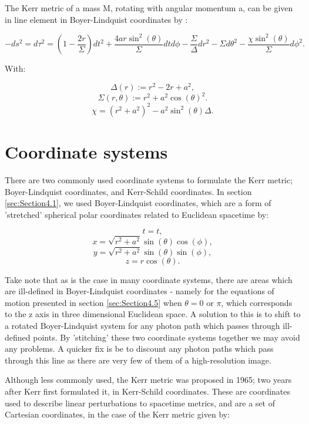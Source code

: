 \documentclass[oneside,openright,frontopenright, singlespacing]{dmathesis}
\begin{document}
\vspace{1em}
	The Kerr metric of a mass M, rotating with angular momentum a, can be given in line element in Boyer-Lindquist coordinates by \cite{boyer1967maximal}:

	\[-ds^2=d\tau^{2} = \left(1-\frac{2r}{\Sigma}\right)dt^2+\frac{4ar\sin^2(\theta)}{\Sigma}dtd\phi-\frac{\Sigma}{\Delta}dr^2-{\Sigma}d\theta^2-\frac{\chi\sin^2(\theta)}{\Sigma}d\phi^2.\]

\vspace{1em}
	With:
	
	\[\Delta(r) := r^2 - 2r + a^2,\]
	\[\Sigma(r, \theta) := r^2 + a^2\cos(\theta)^2.\]
	\[\chi = (r^2+a^2)^2-a^2\sin^2(\theta)\Delta.\]

\section{Coordinate systems}\label{sec:Section4.2}

	There are two commonly used coordinate systems to formulate the Kerr metric; Boyer-Lindquist coordinates\cite{boyer1967maximal}, and Kerr-Schild coordinates\cite{debney1969solutions}. In section \ref{sec:Section4.1}, we used Boyer-Lindquist coordinates, which are a form of 'stretched' spherical polar coordinates related to Euclidean spacetime by:

	\[t=t,\]
	\[x = \sqrt{r^2+a^2}\sin(\theta)\cos(\phi),\]
	\[y = \sqrt{r^2+a^2}\sin(\theta)\sin(\phi),\]
	\[z = r\cos(\theta).\]

\vspace{1em}
	Take note that as is the case in many coordinate systems, there are areas which are ill-defined in Boyer-Lindquist coordinates - namely for the equations of motion presented in section \ref{sec:Section4.5} when $\theta=0\mbox{ or }\pi$, which corresponds to the z axis in three dimensional Euclidean space. A solution to this is to shift to a rotated Boyer-Lindquist system for any photon path which passes through ill-defined points. By 'stitching' these two coordinate systems together we may avoid any problems. A quicker fix is be to discount any photon paths which pass through this line as there are very few of them of a high-resolution image.

\vspace{1em}
	Although less commonly used, the Kerr metric was proposed in 1965; two years after Kerr first formulated it, in Kerr-Schild coordinates. These are coordinates used to describe linear perturbations to spacetime metrics, and are a set of Cartesian coordinates, in the case of the Kerr metric given by:
\end{document}
